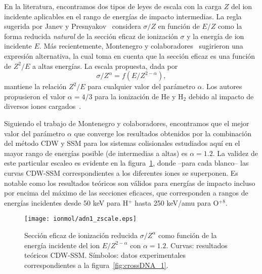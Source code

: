 



En la literatura, encontramos dos tipos de leyes de escala con la carga 
$Z$ del ion incidente aplicables en el rango de energías de impacto
intermedias. La regla sugerida por Janev y Presnyakov~\cite{Janev:80} 
considera $\sigma/Z$ en función de $E/Z$ como la forma reducida 
\textit{natural} de la sección eficaz de ionización $\sigma$ y la energía
de ion incidente $E$. Más recientemente, Montenegro y 
colaboradores~\cite{Dubois:13,Montenegro:13} sugirieron una expresión
alternativa, la cual toma en cuenta que la sección eficaz es una función
de $Z^2/E$ a altas energías. La escala propuesta, dada por
\begin{equation}
 \sigma/Z^{\alpha}=f(E/Z^{2-\alpha}),
\label{eq:Montenegro}
\end{equation}
mantiene la relación $Z^2/E$ para cualquier valor del parámetro $\alpha$. 
Los autores propusieron el valor $\alpha=4/3$ para la ionización de He y
H$_2$ debido al impacto de diversos iones cargados~\cite{dubois2013}. 

Siguiendo el trabajo de Montenegro y colaboradores, encontramos que el
mejor valor del parámetro $\alpha$ que converge los resultados obtenidos
por la combinación del método CDW y SSM para los sistemas colisionales
estudiados aquí en el mayor rango de energías posible (de intermedias a 
altas) es $\alpha=1.2$. La validez de este particular escaleo es evidente
en la figura~\ref{fig:zreduced}, donde --para cada blanco-- las curvas 
CDW-SSM correspondientes a los diferentes iones se superponen. Es notable
como los resultados teóricos son válidos para energías de impacto incluso
por encima del máximo de las secciones eficaces, que corresponden a
rangos de energías incidentes desde 50 keV para H$^+$ hasta 250 keV/amu 
para O$^{+8}$.

\begin{figure}
\centering
\texttt{[image: ionmol/adn1\_zscale.eps]}
\caption[Sección eficaz de ionización reducida por $Z$ y $\alpha$ 
(Parte I).]
{Sección eficaz de ionización reducida $\sigma/Z^{\alpha}$ como función
de la energía incidente del ion $E/Z^{2-\alpha}$ con $\alpha=1.2$. 
Curvas: resultados teóricos CDW-SSM. 
Símbolos: datos experimentales correspondientes a la 
figura~\ref{fig:crossDNA_1}.}
\label{fig:zreduced}
\end{figure} 


